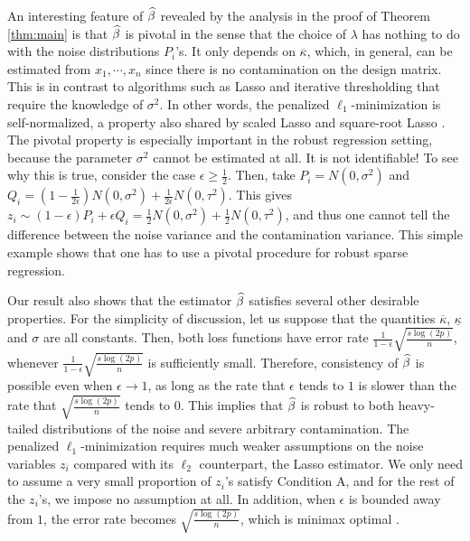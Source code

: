 An interesting feature of $\widehat{\beta}$ revealed by the analysis in the proof of Theorem \ref{thm:main} is that $\widehat{\beta}$ is pivotal in the sense that the choice of $\lambda$ has nothing to do with the noise distributions $P_i$'s. It only depends on $\overline{\kappa}$, which, in general, can be estimated from $x_1,\cdots, x_n$ since there is no contamination on the design matrix. This is in contrast to algorithms such as Lasso \citep{bickel2009simultaneous} and iterative thresholding \citep{suggala2019adaptive} that require the knowledge of $\sigma^2$. In other words, the penalized $\ell_1$-minimization is self-normalized, a property also shared by scaled Lasso \citep{sun2012scaled} and square-root Lasso \citep{belloni2011square}. The pivotal property is especially important in the robust regression setting, because the parameter $\sigma^2$ cannot be estimated at all. It is not identifiable! To see why this is true, consider the case $\epsilon\geq \frac{1}{2}$. Then, take $P_i=N(0,\sigma^2)$ and $Q_i=\left(1-\frac{1}{2\epsilon}\right)N(0,\sigma^2)+\frac{1}{2\epsilon}N(0,\tau^2)$. This gives $z_i\sim (1-\epsilon)P_i+\epsilon Q_i = \frac{1}{2}N(0,\sigma^2)+\frac{1}{2}N(0,\tau^2)$,
and thus one cannot tell the difference between the noise variance and the contamination variance. This simple example shows that one has to use a pivotal procedure for robust sparse regression.

Our result also shows that the estimator $\widehat{\beta}$ satisfies several other desirable properties. For the simplicity of discussion, let us suppose that the quantities $\overline{\kappa}$, $\underline{\kappa}$ and $\sigma$ are all constants. Then, both loss functions have error rate $\frac{1}{1-\epsilon}\sqrt{\frac{s\log(2p)}{n}}$, whenever $\frac{1}{1-\epsilon}\sqrt{\frac{s\log(2p)}{n}}$ is sufficiently small. Therefore, consistency of $\widehat{\beta}$ is possible even when $\epsilon\rightarrow 1$, as long as the rate that $\epsilon$ tends to $1$ is slower than the rate that $\sqrt{\frac{s\log(2p)}{n}}$ tends to $0$. This implies that $\widehat{\beta}$ is robust to both heavy-tailed distributions of the noise and severe arbitrary contamination. The penalized $\ell_1$-minimization requires much weaker assumptions on the noise variables $z_i$ compared with its $\ell_2$ counterpart, the Lasso estimator. We only need to assume a very small proportion of $z_i$'s satisfy Condition A, and for the rest of the $z_i$'s, we impose no assumption at all. In addition, when $\epsilon$ is bounded away from $1$, the error rate becomes $\sqrt{\frac{s\log(2p)}{n}}$, which is minimax optimal \citep{raskutti2011minimax}.


